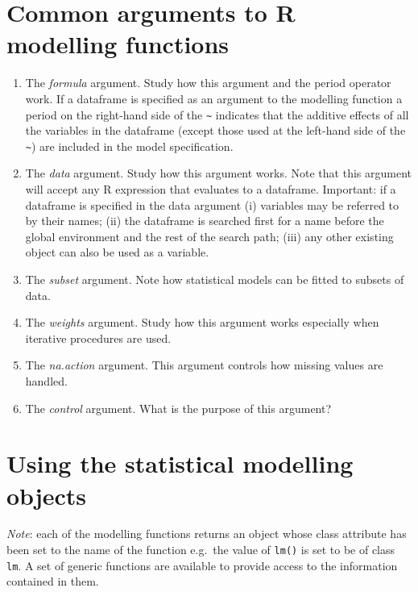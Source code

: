 \documentclass[
]{book}
\begin{document}
\section{Common arguments to R modelling functions}\label{common-arguments-to-r-modelling-functions}

\begin{enumerate}
\def\labelenumi{(\alph{enumi})}
\item
  The \emph{{formula}} argument. Study how this argument and the period operator work. If a dataframe is specified as an argument to the modelling function a period on the right-hand side of the \texttt{\textasciitilde{}} indicates that the additive effects of all the variables in the dataframe (except those used at the left-hand side of the \texttt{\textasciitilde{}}) are included in the model specification.
\item
  The \emph{{data}} argument. Study how this argument works. Note that this argument will accept any R expression that evaluates to a dataframe. Important: if a dataframe is specified in the data argument (i) variables may be referred to by their names; (ii) the dataframe is searched first for a name before the global environment and the rest of the search path; (iii) any other existing object can also be used as a variable.
\item
  The \emph{{subset}} argument. Note how statistical models can be fitted to subsets of data.
\item
  The \emph{{weights}} argument. Study how this argument works especially when iterative procedures are used.
\item
  The \emph{{na.action}} argument. This argument controls how missing values are handled.
\item
  The \emph{{control}} argument. What is the purpose of this argument?
\end{enumerate}

\section{Using the statistical modelling objects}\label{using-the-statistical-modelling-objects}

\emph{Note}: each of the modelling functions returns an object whose class attribute has been set to the name of the function e.g.~the value of \texttt{lm()} is set to be of class \texttt{lm}. A set of generic functions are available to provide access to the information contained in them.
\end{document}
